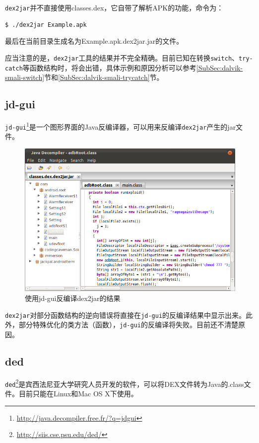 \lstinline!dex2jar!并不直接使用classes.dex，它自带了解析APK的功能，命令为：
\begin{lstlisting}[language=bash, numbers=none]
 $ ./dex2jar Example.apk
\end{lstlisting}
最后在当前目录生成名为Example.apk.dex2jar.jar的文件。

应当注意的是，\lstinline!dex2jar!工具的结果并不完全精确。目前已知在转换\lstinline!switch!、\lstinline!try-catch!等函数结构时，将会出错，具体示例和原因分析可以参考\ref{SubSec:dalvik-smali-switch}节和\ref{SubSec:dalvik-smali-trycatch}节。

\subsection{jd-gui}
\lstinline!jd-gui!\footnote{\url{http://java.decompiler.free.fr/?q=jdgui}}是一个图形界面的Java反编译器，可以用来反编译\lstinline!dex2jar!产生的jar文件。

\begin{figure}[htbp]
  \centering
  \includegraphics[width=14cm]{image/jd-gui.png}
  \caption{使用jd-gui反编译dex2jar的结果}
  \label{Fig:jd-gui}
\end{figure}

\lstinline!dex2jar!对部分函数结构的逆向错误将直接在\lstinline!jd-gui!的反编译结果中显示出来。此外，部分特殊优化的类方法（函数），\lstinline!jd-gui!的反编译将失败。目前还不清楚原因。

\subsection{ded}
\lstinline!ded!\footnote{\url{http://siis.cse.psu.edu/ded/}}是宾西法尼亚大学研究人员开发的软件，可以将DEX文件转为Java的.class文件。目前只能在Linux和Mac OS X下使用。

